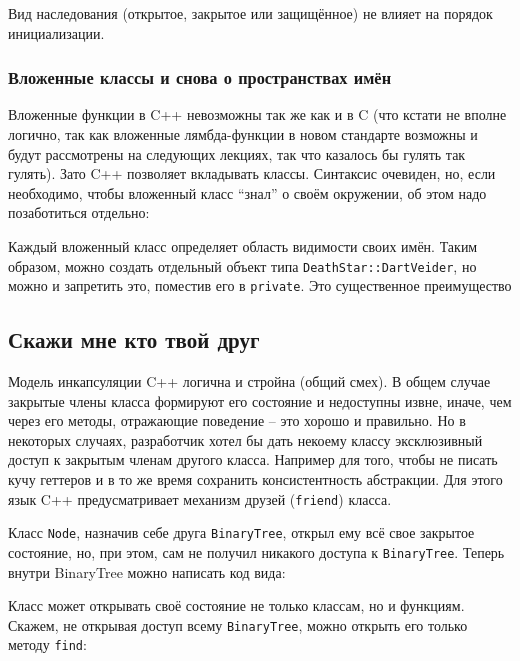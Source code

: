 \documentclass[a4paper,12pt,oneside]{article}
\begin{document}
Вид наследования (открытое, закрытое или защищённое) не влияет на порядок инициализации.

\subsubsection{Вложенные классы и снова о пространствах имён}\label{InnerClasses}

Вложенные функции в C++ невозможны так же как и в C (что кстати не вполне логично, так как вложенные лямбда-функции в новом стандарте возможны и будут рассмотрены на следующих лекциях, так что казалось бы гулять так гулять). Зато C++ позволяет вкладывать классы. Синтаксис очевиден, но, если необходимо, чтобы вложенный класс ``знал'' о своём окружении, об этом надо позаботиться отдельно:



Каждый вложенный класс определяет область видимости своих имён. Таким образом, можно создать отдельный объект типа \lstinline!DeathStar::DartVeider!, но можно и запретить это, поместив его в \lstinline!private!. Это существенное преимущество

\pagebreak
\subsection{Скажи мне кто твой друг}\label{WhosYourFriend}

Модель инкапсуляции C++ логична и стройна (общий смех). В общем случае закрытые члены класса формируют его состояние и недоступны извне, иначе, чем через его методы, отражающие поведение -- это хорошо и правильно. Но в некоторых случаях, разработчик хотел бы дать некоему классу эксклюзивный доступ к закрытым членам другого класса. Например для того, чтобы не писать кучу геттеров и в то же время сохранить консистентность абстракции. Для этого язык C++ предусматривает механизм друзей (\lstinline!friend!) класса.



Класс \lstinline!Node!, назначив себе друга \lstinline!BinaryTree!, открыл ему всё свое закрытое состояние, но, при этом, сам не получил никакого доступа к \lstinline!BinaryTree!. Теперь внутри BinaryTree можно написать код вида:



Класс может открывать своё состояние не только классам, но и функциям. Скажем, не открывая доступ всему \lstinline!BinaryTree!, можно открыть его только методу \lstinline!find!:
\end{document}
